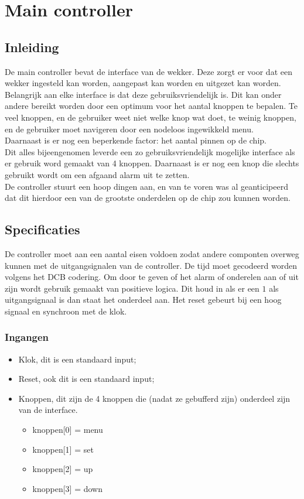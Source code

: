 \chapter{Main controller}
\section{Inleiding}
De main controller bevat de interface van de wekker. Deze zorgt er voor dat een wekker ingesteld kan worden, aangepast kan worden en uitgezet kan worden. 
Belangrijk aan elke interface is dat deze gebruiksvriendelijk is. 
Dit kan onder andere bereikt worden door een optimum voor het aantal knoppen te bepalen. 
Te veel knoppen, en de gebruiker weet niet welke knop wat doet, te weinig knoppen, en de gebruiker moet navigeren door een nodeloos ingewikkeld menu. \\
Daarnaast is er nog een beperkende factor: het aantal pinnen op de chip. \\
Dit alles bijeengenomen leverde een zo gebruiksvriendelijk mogelijke interface als er gebruik word gemaakt van 4 knoppen. Daarnaast is er nog een knop die slechts gebruikt wordt om een afgaand alarm uit te zetten. \\
De controller stuurt een hoop dingen aan, en van te voren was al geanticipeerd dat dit hierdoor een van de grootste onderdelen op de chip zou kunnen worden.

\section{Specificaties}
De controller moet aan een aantal eisen voldoen zodat andere componten overweg kunnen met de uitgangsignalen van de controller. De tijd moet gecodeerd worden volgens het DCB codering. Om door te geven of het alarm of onderelen aan of uit zijn wordt gebruik gemaakt van positieve logica. Dit houd in als er een $1$ als uitgangsignaal is dan staat het onderdeel aan. Het reset gebeurt bij een hoog signaal en synchroon met de klok.

\subsection{Ingangen}
\begin{itemize}[nolistsep]
\item Klok, dit is een standaard input;
\item Reset, ook dit is een standaard input;
\item Knoppen, dit zijn de 4 knoppen die (nadat ze gebufferd zijn) onderdeel zijn van de interface.
\begin{itemize}[nolistsep]
\item knoppen[0] = menu
\item knoppen[1] = set 
\item knoppen[2] = up
\item knoppen[3] = down\\
\end{itemize}
\end{itemize}




